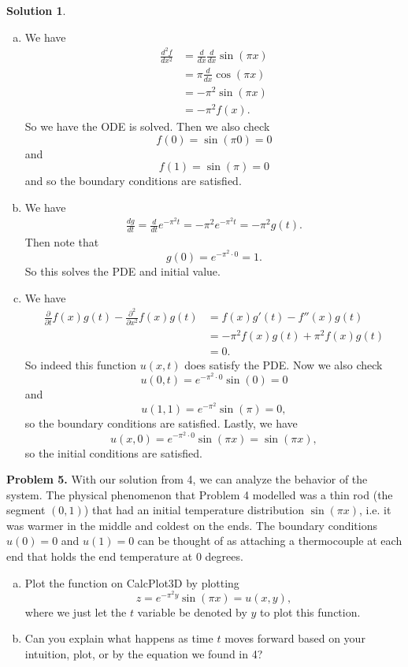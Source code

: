 \documentclass[12pt]{report} %
\theoremstyle{definition}
\newtheorem{solution}{Solution}
\begin{document}
\begin{solution}~
\begin{enumerate}[(a)]
    \item We have
    \begin{align*}
    \frac{d^2f}{dx^2}&= \frac{d}{dx}\frac{d}{dx} \sin(\pi x)\\
    &= \pi \frac{d}{dx} \cos(\pi x)\\
    &= -\pi^2 \sin(\pi x)\\
    &= -\pi^2 f(x).
    \end{align*}
    So we have the ODE is solved.  Then we also check
    \[
    f(0)=\sin(\pi 0) = 0
    \]
    and
    \[
    f(1)=\sin(\pi) = 0
    \]
    and so the boundary conditions are satisfied.
    \item We have
    \begin{align*}
        \frac{dg}{dt} = \frac{d}{dt} e^{-\pi^2 t} = -\pi^2 e^{-\pi^2 t} = -\pi^2 g(t).
    \end{align*}
    Then note that
    \[
    g(0) = e^{-\pi^2 \cdot 0} = 1.
    \]
    So this solves the PDE and initial value.
    
    \item We have
    \begin{align*}
        \frac{\partial}{\partial t} f(x)g(t) - \frac{\partial^2}{\partial x^2} f(x)g(t) &= f(x) g'(t)-f''(x)g(t)\\
        &= -\pi^2 f(x)g(t)+\pi^2 f(x)g(t)\\
        &= 0.
    \end{align*}
    So indeed this function $u(x,t)$ does satisfy the PDE.  Now we also check
    \[
    u(0,t) = e^{-\pi^2\cdot 0} \sin(0)=0
    \]
    and
    \[
    u(1,1) = e^{-\pi^2} \sin(\pi)=0,
    \]
    so the boundary conditions are satisfied. Lastly, we have
    \[
    u(x,0)=e^{-\pi^2 \cdot 0 }\sin(\pi x) = \sin(\pi x),
    \]
    so the initial conditions are satisfied.
\end{enumerate}
\end{solution}
\vspace*{.5cm}

\noindent\textbf{Problem 5.} With our solution from 4, we can analyze the behavior of the system.  The physical phenomenon that Problem 4 modelled was a thin rod (the segment $(0,1)$) that had an initial temperature distribution $\sin(\pi x)$, i.e. it was warmer in the middle and coldest on the ends.  The boundary conditions $u(0)=0$ and $u(1)=0$ can be thought of as attaching a thermocouple at each end that holds the end temperature at $0$ degrees.  
\begin{enumerate}[(a)]
    \item Plot the function on CalcPlot3D by plotting
    \[
    z=e^{-\pi^2 y} \sin(\pi x)= u(x,y),
    \]
    where we just let the $t$ variable be denoted by $y$ to plot this function.
    \item Can you explain what happens as time $t$ moves forward based on your intuition, plot, or by the equation we found in 4?
\end{enumerate}
\end{document}
